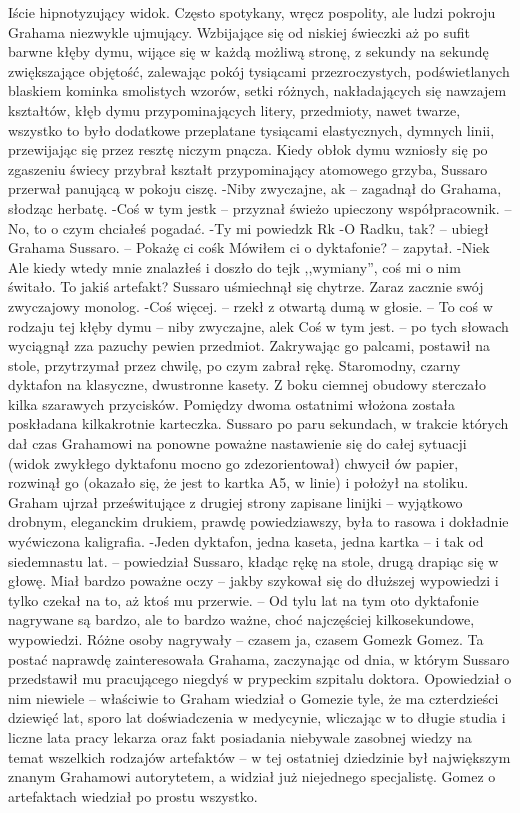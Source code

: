 \documentclass[../MAIN.tex]{subfiles}
\begin{document}
Iście hipnotyzujący widok. Często spotykany, wręcz pospolity, ale ludzi pokroju Grahama niezwykle ujmujący.
Wzbijające się od niskiej świeczki aż po sufit barwne kłęby dymu, wijące się w każdą możliwą stronę, z sekundy na sekundę zwiększające objętość, zalewając pokój tysiącami przezroczystych, podświetlanych blaskiem kominka smolistych wzorów, setki różnych, nakładających się nawzajem kształtów, kłęb dymu przypominających litery, przedmioty, nawet twarze, wszystko to było dodatkowe przeplatane tysiącami elastycznych, dymnych linii, przewijając się przez resztę niczym pnącza.
Kiedy obłok dymu wzniosły się po zgaszeniu świecy przybrał kształt przypominający atomowego grzyba, Sussaro przerwał panującą w pokoju ciszę.
-Niby zwyczajne, a\3k -- zagadnął do Grahama, słodząc herbatę.
-Coś w tym jest\3k -- przyznał świeżo upieczony współpracownik. -- No, to o czym chciałeś pogadać.
-Ty mi powiedz\3k
R\3k
-O Radku, tak? -- ubiegł Grahama Sussaro. -- Pokażę ci coś\3k Mówiłem ci o dyktafonie? -- zapytał.
-Nie\3k Ale kiedy wtedy mnie znalazłeś i doszło do tej\3k ,,wymiany'', coś mi o nim świtało. To jakiś artefakt?
Sussaro uśmiechnął się chytrze. Zaraz zacznie swój zwyczajowy monolog.
-Coś więcej. -- rzekł z otwartą dumą w głosie. -- To coś w rodzaju tej kłęby dymu -- niby zwyczajne, ale\3k Coś w tym jest. -- po tych słowach wyciągnął zza pazuchy pewien przedmiot. Zakrywając go palcami, postawił na stole, przytrzymał przez chwilę, po czym zabrał rękę.
Staromodny, czarny dyktafon na klasyczne, dwustronne kasety. Z boku ciemnej obudowy sterczało kilka szarawych przycisków. Pomiędzy dwoma ostatnimi włożona została poskładana kilkakrotnie karteczka. Sussaro po paru sekundach, w trakcie których dał czas Grahamowi na ponowne poważne nastawienie się do całej sytuacji (widok zwykłego dyktafonu mocno go zdezorientował) chwycił ów papier, rozwinął go (okazało się, że jest to kartka A5, w linie) i położył na stoliku. Graham ujrzał prześwitujące z drugiej strony zapisane linijki -- wyjątkowo drobnym, eleganckim drukiem, prawdę powiedziawszy, była to rasowa i dokładnie wyćwiczona kaligrafia.
-Jeden dyktafon, jedna kaseta, jedna kartka -- i tak od siedemnastu lat. -- powiedział Sussaro, kładąc rękę na stole, drugą drapiąc się w głowę. Miał bardzo poważne oczy -- jakby szykował się do dłuższej wypowiedzi i tylko czekał na to, aż ktoś mu przerwie. -- Od tylu lat na tym oto dyktafonie nagrywane są bardzo, ale to bardzo ważne, choć najczęściej kilkosekundowe, wypowiedzi. Różne osoby nagrywały -- czasem ja, czasem Gomez\3k
Gomez.
Ta postać naprawdę zainteresowała Grahama, zaczynając od dnia, w którym Sussaro przedstawił mu pracującego niegdyś w prypeckim szpitalu doktora. Opowiedział o nim niewiele -- właściwie to Graham wiedział o Gomezie tyle, że ma czterdzieści dziewięć lat, sporo lat doświadczenia w medycynie, wliczając w to długie studia i liczne lata pracy lekarza oraz fakt posiadania niebywale zasobnej wiedzy na temat wszelkich rodzajów artefaktów -- w tej ostatniej dziedzinie był największym znanym Grahamowi autorytetem, a widział już niejednego specjalistę. Gomez o artefaktach wiedział po prostu wszystko.
\end{document}
